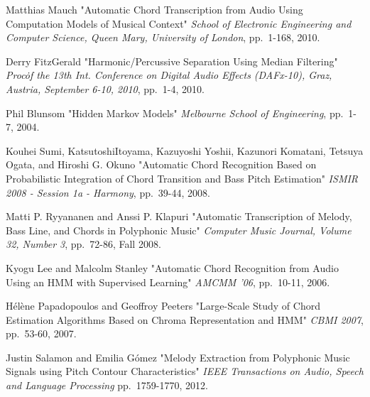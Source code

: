 \documentclass{article}
\begin{document}
\begin{thebibliography}{citations}
Matthias Mauch
"Automatic Chord Transcription from Audio Using Computation Models of Musical Context"
{\it School of Electronic Engineering and Computer Science, Queen Mary, University of London},
pp.~1-168, 2010.

Derry FitzGerald
"Harmonic/Percussive Separation Using Median Filtering"
{\it Proc\. of the 13th Int. Conference on Digital Audio Effects (DAFx-10), Graz, Austria, September 6-10, 2010},
pp.~1-4, 2010.

Phil Blunsom
"Hidden Markov Models"
{\it Melbourne School of Engineering},
pp.~1-7, 2004.

Kouhei Sumi, KatsutoshiItoyama, Kazuyoshi Yoshii, Kazunori Komatani, Tetsuya Ogata, and Hiroshi G. Okuno
"Automatic Chord Recognition Based on Probabilistic Integration of Chord Transition and Bass Pitch Estimation"
{\it ISMIR 2008 - Session 1a - Harmony},
pp.~39-44, 2008.

Matti P. Ryyananen and Anssi P. Klapuri
"Automatic Transcription of Melody, Bass Line, and Chords in Polyphonic Music"
{\it Computer Music Journal, Volume 32, Number 3},
pp.~72-86, Fall 2008.

Kyogu Lee and Malcolm Stanley
"Automatic Chord Recognition from Audio Using an HMM with Supervised Learning"
{\it AMCMM '06},
pp.~10-11, 2006.

Hélène Papadopoulos and Geoffroy Peeters
"Large-Scale Study of Chord Estimation Algorithms Based on Chroma Representation and HMM"
{\it CBMI 2007},
pp.~53-60, 2007.

Justin Salamon and Emilia G{\'o}mez
"Melody Extraction from Polyphonic Music Signals using Pitch Contour Characteristics"
{\it IEEE Transactions on Audio, Speech and Language Processing}
pp.~1759-1770, 2012.


\end{thebibliography}


\end{document}
